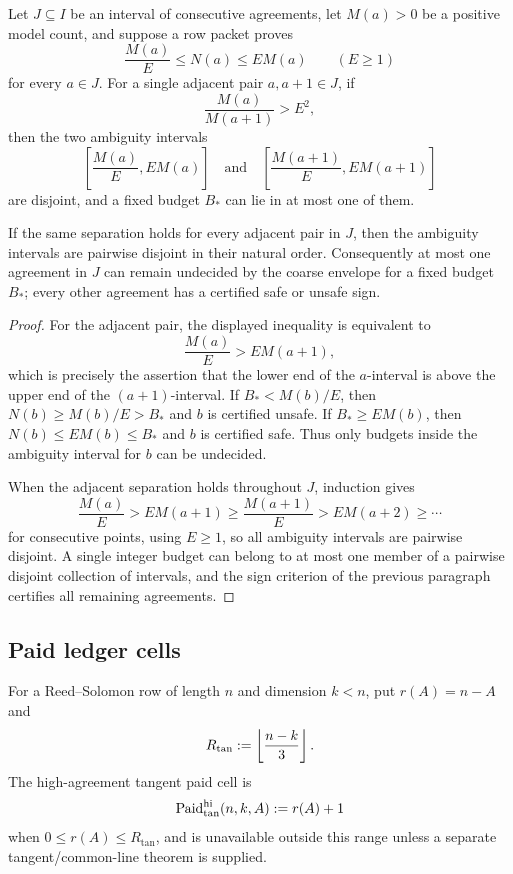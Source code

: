 \begin{theorem}\label{thm:v13-steepness}
Let $J\subseteq I$ be an interval of consecutive agreements, let $M(a)>0$ be a positive model count, and suppose a row packet proves
\[
        \frac{M(a)}{E}\le N(a)\le E M(a)\qquad(E\ge1)
\]
for every $a\in J$.  For a single adjacent pair $a,a+1\in J$, if
\[
        \frac{M(a)}{M(a+1)}>E^2,
\]
then the two ambiguity intervals
\[
        \left[\frac{M(a)}E,EM(a)\right]
        \quad\text{and}\quad
        \left[\frac{M(a+1)}E,EM(a+1)\right]
\]
are disjoint, and a fixed budget $B_*$ can lie in at most one of them.

If the same separation holds for every adjacent pair in $J$, then the ambiguity intervals are pairwise disjoint in their natural order.  Consequently at most one agreement in $J$ can remain undecided by the coarse envelope for a fixed budget $B_*$; every other agreement has a certified safe or unsafe sign.
\end{theorem}

\begin{proof}
For the adjacent pair, the displayed inequality is equivalent to
\[
        \frac{M(a)}E>EM(a+1),
\]
which is precisely the assertion that the lower end of the $a$-interval is above the upper end of the $(a+1)$-interval.  If $B_*<M(b)/E$, then $N(b)\ge M(b)/E>B_*$ and $b$ is certified unsafe.  If $B_*\ge EM(b)$, then $N(b)\le EM(b)\le B_*$ and $b$ is certified safe.  Thus only budgets inside the ambiguity interval for $b$ can be undecided.

When the adjacent separation holds throughout $J$, induction gives
\[
        \frac{M(a)}E>EM(a+1)\ge \frac{M(a+1)}E>EM(a+2)\ge\cdots
\]
for consecutive points, using $E\ge1$, so all ambiguity intervals are pairwise disjoint.  A single integer budget can belong to at most one member of a pairwise disjoint collection of intervals, and the sign criterion of the previous paragraph certifies all remaining agreements.
\end{proof}

\subsection{Paid ledger cells}

\begin{definition}\label{def:v13-tangent-cell}
For a Reed--Solomon row of length $n$ and dimension $k<n$, put $r(A)=n-A$ and
\[
        R_{\tan}:=\left\lfloor \frac{n-k}{3}\right\rfloor.
\]
The high-agreement tangent paid cell is
\[
        \operatorname{Paid}_{\tan}^{\mathrm{hi}}(n,k,A):=r(A)+1
\]
when $0\le r(A)\le R_{\tan}$, and is unavailable outside this range unless a separate tangent/common-line theorem is supplied.
\end{definition}

